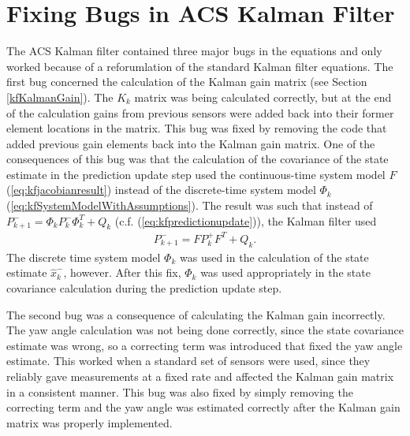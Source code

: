 \section{Fixing Bugs in ACS Kalman Filter}
\label{sec:kfBugs}
The ACS Kalman filter contained three major bugs in the equations and only worked because of a reforumlation of the standard Kalman filter equations. The first bug concerned the calculation of the Kalman gain matrix (see Section \ref{kfKalmanGain}). The $K_k$ matrix was being calculated correctly, but at the end of the calculation gains from previous sensors were added back into their former element locations in the matrix. This bug was fixed by removing the code that added previous gain elements back into the Kalman gain matrix. One of the consequences of this bug was that the calculation of the covariance of the state estimate in the prediction update step used the continuous-time system model $F$ (\ref{eq:kfjacobianresult}) instead of the discrete-time system model $\Phi_k$ (\ref{eq:kfSystemModelWithAssumptions}). The result was such that instead of $P_{k+1}^- = \Phi_kP_k^-\Phi_k^T + Q_k$ (c.f. (\ref{eq:kfpredictionupdate})), the Kalman filter used
\begin{align*}
P_{k+1}^- = FP_k^+F^T + Q_k.
\end{align*}
The discrete time system model $\Phi_k$ was used in the calculation of the state estimate $\hat{x}_k^-$, however. After this fix, $\Phi_k$ was used appropriately in the state covariance calculation during the prediction update step.

The second bug was a consequence of calculating the Kalman gain incorrectly. The yaw angle calculation was not being done correctly, since the state covariance estimate was wrong, so a correcting term was introduced that fixed the yaw angle estimate. This worked when a standard set of sensors were used, since they reliably gave measurements at a fixed rate and affected the Kalman gain matrix in a consistent manner. This bug was also fixed by simply removing the correcting term and the yaw angle was estimated correctly after the Kalman gain matrix was properly implemented.

